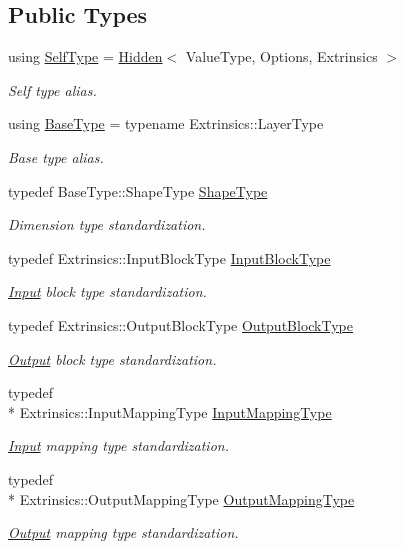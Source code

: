 \subsection*{Public Types}
\begin{DoxyCompactItemize}
\item 
using \hyperlink{classffnn_1_1layer_1_1_hidden_a27c65759b388a6312329cf610d4fa4a3}{Self\-Type} = \hyperlink{classffnn_1_1layer_1_1_hidden}{Hidden}$<$ Value\-Type, Options, Extrinsics $>$
\begin{DoxyCompactList}\small\item\em Self type alias. \end{DoxyCompactList}\item 
using \hyperlink{classffnn_1_1layer_1_1_hidden_af146958f4a1b59faba4ae2b2eb521faf}{Base\-Type} = typename Extrinsics\-::\-Layer\-Type
\begin{DoxyCompactList}\small\item\em Base type alias. \end{DoxyCompactList}\item 
typedef Base\-Type\-::\-Shape\-Type \hyperlink{classffnn_1_1layer_1_1_hidden_a567e902299b3355501393cf6c7b27c38}{Shape\-Type}
\begin{DoxyCompactList}\small\item\em Dimension type standardization. \end{DoxyCompactList}\item 
typedef Extrinsics\-::\-Input\-Block\-Type \hyperlink{classffnn_1_1layer_1_1_hidden_abd5a3b5c55984948f903fe88759efaf4}{Input\-Block\-Type}
\begin{DoxyCompactList}\small\item\em \hyperlink{classffnn_1_1layer_1_1_input}{Input} block type standardization. \end{DoxyCompactList}\item 
typedef Extrinsics\-::\-Output\-Block\-Type \hyperlink{classffnn_1_1layer_1_1_hidden_a9fd326932b57e1d86d86bdb168822727}{Output\-Block\-Type}
\begin{DoxyCompactList}\small\item\em \hyperlink{classffnn_1_1layer_1_1_output}{Output} block type standardization. \end{DoxyCompactList}\item 
typedef \\*
Extrinsics\-::\-Input\-Mapping\-Type \hyperlink{classffnn_1_1layer_1_1_hidden_ac518f2e2be1250c1af7b2f8574cadc8d}{Input\-Mapping\-Type}
\begin{DoxyCompactList}\small\item\em \hyperlink{classffnn_1_1layer_1_1_input}{Input} mapping type standardization. \end{DoxyCompactList}\item 
typedef \\*
Extrinsics\-::\-Output\-Mapping\-Type \hyperlink{classffnn_1_1layer_1_1_hidden_a9d882e035c7cd80ccd9b58fbe832591e}{Output\-Mapping\-Type}
\begin{DoxyCompactList}\small\item\em \hyperlink{classffnn_1_1layer_1_1_output}{Output} mapping type standardization. \end{DoxyCompactList}\end{DoxyCompactItemize}
